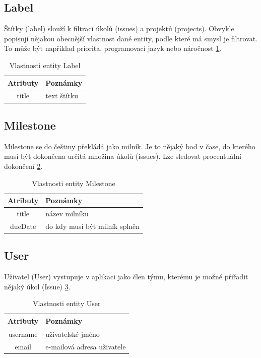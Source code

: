 \subsection{Label}
Štítky (label) slouží k filtraci úkolů (issues) a projektů (projects). Obvykle popisují nějakou obecnější vlastnost dané entity, podle které má smysl je filtrovat. To může být například priorita, programovací jazyk nebo náročnost \ref{tab:label}.

\begin{table}[h]
\begin{center}
	\begin{tabular}{|c|l|}
	\hline
	Atributy & Poznámky \\
	\hline
	title & text štítku \\
	\hline
	\end{tabular}
\end{center}
\caption{Vlastnosti entity Label}
\label{tab:label}
\end{table}

\subsection{Milestone}
Milestone se do češtiny překládá jako milník. Je to nějaký bod v čase, do kterého musí být dokončena určitá množina úkolů (issues). Lze sledovat procentuální dokončení \ref{tab:milestone}.

\begin{table}[h]
\begin{center}
	\begin{tabular}{|c|l|}
	\hline
	Atributy & Poznámky \\
	\hline
	title & název milníku \\
	dueDate & do kdy musí být milník splněn \\
	\hline
	\end{tabular}
\end{center}
\caption{Vlastnosti entity Milestone}
\label{tab:milestone}
\end{table}

\subsection{User}
Uživatel (User) vystupuje v aplikaci jako člen týmu, kterému je možné přiřadit nějaký úkol (Issue) \ref{tab:user}.

\begin{table}[h]
\begin{center}
	\begin{tabular}{|c|l|}
	\hline
	Atributy & Poznámky \\
	\hline
	username & uživatelské jméno \\
	email & e-mailová adresa uživatele \\
	\hline
	\end{tabular}
\end{center}
\caption{Vlastnosti entity User}
\label{tab:user}
\end{table}

